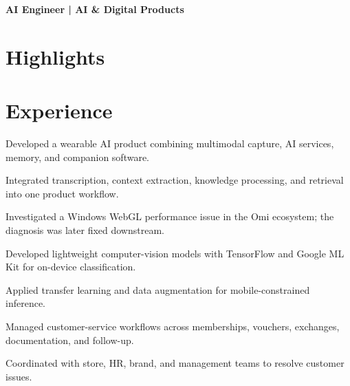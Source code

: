 \documentclass{../../templates/v3/resume-openfont}
\begin{document}

{\small\bfseries AI Engineer | AI \& Digital Products}\par\vspace{2pt}

\section{Highlights}

\section{Experience}
\begin{resumeitemize}
\item Developed a wearable AI product combining multimodal capture, AI services, memory, and companion software.
\item Integrated transcription, context extraction, knowledge processing, and retrieval into one product workflow.
\item Investigated a Windows WebGL performance issue in the Omi ecosystem; the diagnosis was later fixed downstream.
\end{resumeitemize}

\begin{resumeitemize}
\item Developed lightweight computer-vision models with TensorFlow and Google ML Kit for on-device classification.
\item Applied transfer learning and data augmentation for mobile-constrained inference.
\end{resumeitemize}

\begin{resumeitemize}
\item Managed customer-service workflows across memberships, vouchers, exchanges, documentation, and follow-up.
\item Coordinated with store, HR, brand, and management teams to resolve customer issues.
\end{resumeitemize}
\end{document}
